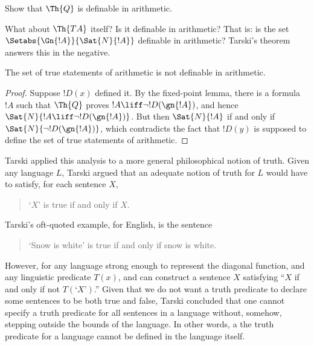\documentclass[../../include/open-logic-section]{subfiles}
\begin{document}
\begin{prob}
Show that $\Th{Q}$ is definable in arithmetic.
\end{prob}

What about $\Th{TA}$ itself? Is it definable in arithmetic? That
is: is the set $\Setabs{\Gn{!A}}{\Sat{N}{!A}}$ definable in
arithmetic? Tarski's theorem answers this in the negative.

\begin{thm}
The set of true statements of arithmetic is not definable in arithmetic.
\end{thm}

\begin{proof} 
Suppose $!D(x)$ defined it. By the fixed-point lemma, there is a
formula $!A$ such that $\Th{Q}$ proves $!A \liff \lnot !D(\gn{!A})$,
and hence $\Sat{N}{!A \liff \lnot !D(\gn{!A})}$. But then
$\Sat{N}{!A}$ if and only if $\Sat{N}{\lnot !D(\gn{!A})}$, which
contradicts the fact that $!D(y)$ is supposed to define the set of true
statements of arithmetic.  
\end{proof}

Tarski applied this analysis to a more general philosophical notion of
truth. Given any language $L$, Tarski argued that an adequate notion
of truth for $L$ would have to satisfy, for each sentence $X$,
\begin{quote}
`$X$' is true if and only if $X$.
\end{quote}
Tarski's oft-quoted example, for English, is the sentence
\begin{quote}
`Snow is white' is true if and only if snow is white.
\end{quote}
However, for any language strong enough to represent the diagonal
function, and any linguistic predicate $T(x)$, and can construct a
sentence $X$ satisfying ``$X$ if and only if not $T(\text{`$X$'})$.''
Given that we do not want a truth predicate to declare some sentences
to be both true and false, Tarski concluded that one cannot specify a
truth predicate for all sentences in a language without, somehow,
stepping outside the bounds of the language. In other words, a the
truth predicate for a language cannot be defined in the language
itself.
\end{document}
